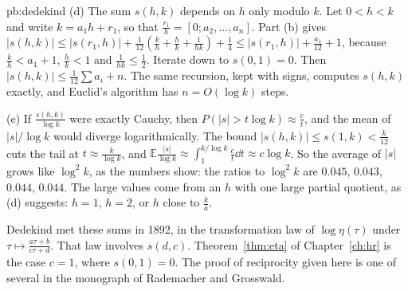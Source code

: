 \begin{solution}{pb:dedekind}
(d) The sum $s(h,k)$ depends on $h$ only modulo $k$. Let $0<h<k$ and write $k=a_1h+r_1$, so that $\frac{r_1}h=[0;a_2,\dots,a_n]$. Part (b) gives $|s(h,k)|\le|s(r_1,h)|+\frac1{12}(\frac kh+\frac hk+\frac1{hk})+\frac14\le|s(r_1,h)|+\frac{a_1}{12}+1$, because $\frac kh<a_1+1$, $\frac hk<1$ and $\frac1{hk}\le\frac12$. Iterate down to $s(0,1)=0$. Then $|s(h,k)|\le\frac1{12}\sum a_i+n$. The same recursion, kept with signs, computes $s(h,k)$ exactly, and Euclid's algorithm has $n=O(\log k)$ steps.

(e) If $\frac{s(h,k)}{\log k}$ were exactly Cauchy, then $P(|s|>t\log k)\approx\frac c t$, and the mean of $|s|/\log k$ would diverge logarithmically. The bound $|s(h,k)|\le s(1,k)<\frac k{12}$ cuts the tail at $t\approx\frac k{\log k}$, and $\mathbb E\frac{|s|}{\log k}\approx\int_1^{k/\log k}\frac c t\dd t\approx c\log k$. So the average of $|s|$ grows like $\log^2k$, as the numbers show: the ratios to $\log^2k$ are $0.045$, $0.043$, $0.044$, $0.044$. The large values come from an $h$ with one large partial quotient, as (d) suggests: $h=1$, $h=2$, or $h$ close to $\frac ka$.


\leads Dedekind met these sums in 1892, in the transformation law of $\log\eta(\tau)$ under $\tau\mapsto\frac{a\tau+b}{c\tau+d}$. That law involves $s(d,c)$. Theorem~\ref{thm:eta} of Chapter~\ref{ch:hr} is the case $c=1$, where $s(0,1)=0$. The proof of reciprocity given here is one of several in the monograph of Rademacher and Grosswald.
\end{solution}

